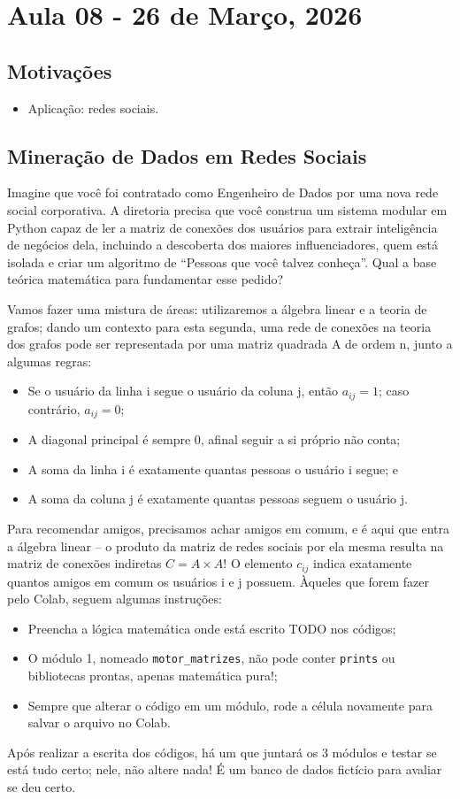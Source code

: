 \documentclass[../numerical_methods.tex]{subfiles}
\begin{document}
\section{Aula 08 - 26 de Março, 2026}
\subsection{Motivações}
\begin{itemize}
	\item Aplicação: redes sociais.
\end{itemize}
\subsection{Mineração de Dados em Redes Sociais}
Imagine que você foi contratado como Engenheiro de Dados por uma nova rede social corporativa. A diretoria precisa que você construa um sistema modular em Python capaz de ler a matriz de conexões dos usuários para extrair inteligência de negócios dela, incluindo a descoberta dos maiores influenciadores, quem está isolada e criar um algoritmo de ``Pessoas que você talvez conheça''.
Qual a base teórica matemática para fundamentar esse pedido?

Vamos fazer uma mistura de áreas: utilizaremos a álgebra linear e a teoria de grafos; dando um contexto para esta segunda, uma rede de conexões na teoria dos grafos pode ser representada por uma matriz quadrada A de ordem n, junto a algumas regras:
\begin{itemize}
	\item Se o usuário da linha i segue o usuário da coluna j, então \(a_{ij}=1\); caso contrário, \(a_{ij}=0\);
	\item A diagonal principal é sempre 0, afinal seguir a si próprio não conta;
	\item A soma da linha i é exatamente quantas pessoas o usuário i segue; e
	\item A soma da coluna j é exatamente quantas pessoas seguem o usuário j.
\end{itemize}

Para recomendar amigos, precisamos achar amigos em comum, e é aqui que entra a álgebra linear -- o produto da matriz de redes sociais por ela mesma resulta na matriz de conexões indiretas \(C = A \times A\)! O elemento \(c_{ij}\) indica exatamente quantos amigos em comum os usuários i e j possuem.
Àqueles que forem fazer pelo Colab, seguem algumas instruções:
\begin{itemize}
	\item[1)] Preencha a lógica matemática onde está escrito TODO nos códigos;
	\item[2)] O módulo 1, nomeado \texttt{motor\_matrizes}, não pode conter \texttt{prints} ou bibliotecas prontas, apenas matemática pura!;
	\item[3)] Sempre que alterar o código em um módulo, rode a célula novamente para salvar o arquivo no Colab.
\end{itemize}
Após realizar a escrita dos códigos, há um que juntará os 3 módulos e testar se está tudo certo; nele, não altere nada! É um banco de dados fictício para avaliar se deu certo.
\end{document}

